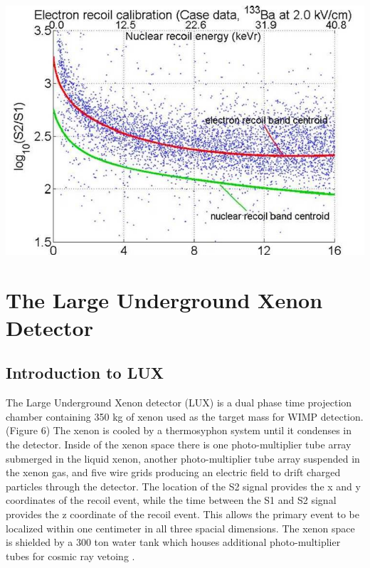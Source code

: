 \documentclass[a4paper,12pt]{article}
\begin{document}
\begin{center}
\includegraphics[scale=0.75]{Recoils.jpg}
\end{center}

\section{The Large Underground Xenon Detector}

\subsection{Introduction to LUX}
The Large Underground Xenon detector (LUX) is a dual phase time projection chamber containing 350 kg of xenon used as the target mass for WIMP detection. (Figure 6) The xenon is cooled by a thermosyphon system until it condenses in the detector.  Inside of the xenon space there is one photo-multiplier tube array submerged in the liquid xenon, another photo-multiplier tube array suspended in the xenon gas, and five wire grids producing an electric field to drift charged particles through the detector.  The location of the S2 signal provides the x and y coordinates of the recoil event, while the time between the S1 and S2 signal provides the z coordinate of the recoil event.  This allows the primary event to be localized within one centimeter in all three spacial dimensions.  The xenon space is shielded by a 300 ton water tank which houses additional photo-multiplier tubes for cosmic ray vetoing \cite{McKinsey,Fiorucci}.
\end{document}
